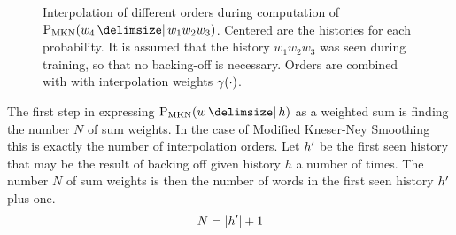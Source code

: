 \begin{figure}
  \centering
  \caption{
    Interpolation of different orders during computation of
    $\ProbMKN{w_4}{w_1 w_2 w_3}$.
    Centered are the histories for each probability.
    It is assumed that the history $w_1 w_2 w_3$ was seen during training, so
    that no backing-off is necessary.
    Orders are combined with with interpolation weights $\gamma(\cdot)$.
  }
  \label{fig:history-mkn}
\end{figure}

The first step in expressing $\ProbMKN{w}{h}$ as a weighted sum is finding the
number $N$ of sum weights.
In the case of Modified Kneser-Ney Smoothing this is exactly the number of
interpolation orders.
Let $h^\prime$ be the first seen history that may be the result of backing
off given history $h$ a number of times.
The number $N$ of sum weights is then the number of words in the first seen
history $h^\prime$ plus one.
\begin{equation}
  N = {\left|h^\prime\right|} + 1
\end{equation}

